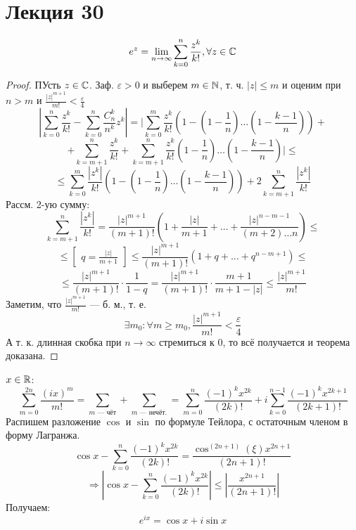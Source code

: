 \section{Лекция 30}
\begin{theorem}
\label{th:exp_form}
\[
e^{z} = \lim_{n\to \infty} \sum_{k = 0}^{n} \frac{z^{k}}{k!}, \forall z \in \mathbb{C}
\]
\end{theorem}
\begin{proof}
ПУсть $z \in \mathbb{C}$. Заф. $\varepsilon > 0$ и выберем $m \in \mathbb{N}$, т. ч. $\left|z\right| \leq m$ и оценим при $n > m$ и $\frac{\left|z\right|^{m + 1}}{m!} < \frac{\varepsilon}{4}$
\[
\left|\sum_{k = 0}^{n} \frac{z^{k}}{k!} - \sum_{k = 0}^{n} \frac{C_{n}^{k}}{n^{k}} z^{k}\right| = \vert \sum_{k = 0}^{m} \frac{z^{k}}{k!} \left(1 - \left(1 - \frac{1}{n}\right)\ldots\left(1 - \frac{k - 1}{n}\right)\right) + 
\]
\[
 + \sum_{k = m + 1}^{n} \frac{z^{k}}{k!} + \sum_{k = m + 1}^{n} \frac{z^{k}}{k!}\left(1 - \frac{1}{n}\right)\ldots\left(1 - \frac{k - 1}{n}\right)\vert \leq
\]
\[
 \leq \sum_{k = 0}^{m} \frac{\left|z^{k}\right|}{k!}\left(1 - \left(1 - \frac{1}{n}\right)\ldots\left(1 - \frac{k - 1}{n}\right)\right) + 2\sum_{k = m + 1}^{n} \frac{\left|z^{k}\right|}{k!}
\]
Рассм. 2-ую сумму:
\[
\sum_{k = m + 1}^{n} \frac{\left|z^{k}\right|}{k!} = \frac{\left|z\right|^{m + 1}}{(m + 1)!} \left(1 + \frac{\left|z\right|}{m + 1} + \ldots + \frac{\left|z\right|^{n - m - 1}}{(m + 2)\ldots n}\right) \leq
\]
\[
 \leq \begin{bmatrix}q = \frac{\left|z\right|}{m + 1} \end{bmatrix} \leq \frac{\left|z\right|^{m + 1}}{(m + 1)!}\left(1 + q + \ldots + q^{n - m + 1}\right) \leq 
\]
\[
   \leq \frac{\left|z\right|^{m + 1}}{(m + 1)!} \cdot \frac{1}{1 - q} = \frac{\left|z\right|^{m + 1}}{(m + 1)!} \cdot \frac{m + 1}{m + 1 - \left|z\right|} \leq \frac{\left|z\right|^{m + 1}}{m!}
\]
Заметим, что $\frac{\left|z\right|^{m + 1}}{m!}$ --- б. м., т. е.
\[
\exists m_0 \colon \forall m \geq m_0, \frac{\left|z\right|^{m + 1}}{m!} < \frac{\varepsilon}{4}
\]
А т. к. длинная скобка при $n \rightarrow \infty$ стремиться к $0$, то всё получается и теорема доказана.
\end{proof}
\begin{example}
$x \in \mathbb{R}$:
\[
\sum_{m = 0}^{2n} \frac{(ix)^{m}}{m!} = \sum_{m \text{ --- чёт}}^{} + \sum_{m \text{ --- нечёт.}}^{} = \sum_{m = 0}^{n} \frac{(-1)^{k}x^{2k}}{(2k)!} + i\sum_{k = 0}^{n - 1} \frac{(-1)^{k} x^{2k + 1}}{(2k + 1)!}
\]
Распишем разложение $\cos$ и $\sin$ по формуле Тейлора, с остаточным членом в форму Лагранжа.
\[
\cos x - \sum_{k = 0}^{n} \frac{(-1)^{k} x^{2k}}{(2k)!} = \frac{\cos^{(2n + 1)}(\xi) x^{2n + 1}}{(2n + 1)!}
\]
\[
\Rightarrow 
\left|\cos x - \sum_{k = 0}^{n} \frac{(-1)^{k} x^{2k}}{(2k)!}\right| \leq \left|\frac{x^{2n + 1}}{(2n + 1)!}\right|
\]
Получаем:
\[
e^{ix} = \cos x + i\sin x
\]
\end{example}
